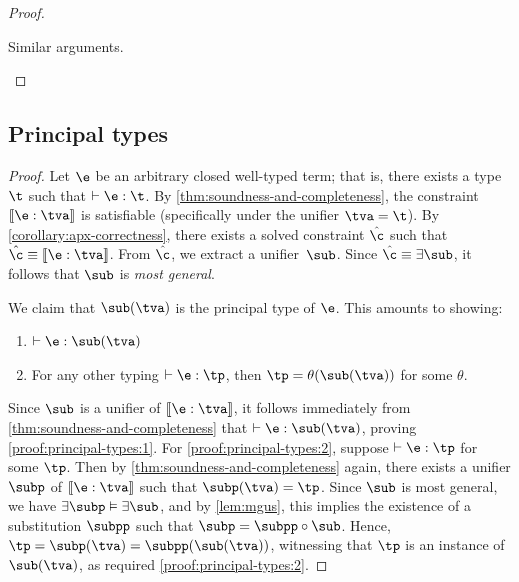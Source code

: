 \documentclass[acmsmall,screen,nonacm%
\Anonymous{,anonymous}{}%
\Final{}{,review}%
]{acmart}
\begin{document}
\begin{theorem}
\begin{proof}
\begin{proofcases}
\begin{proofcases}
\begin{proofcases}
      \proofcase{$\epoly \e$, $\einst \e$, $\erecord {\overline{\elab = \e}}$, $\efield \e \elab$}

	    \begin{llproof}
	      Similar arguments.
	    \end{llproof}
	  \end{proofcases}
	\end{proofcases}
    \end{proofcases}
  \end{proof}
\end{theorem}

\subsection{Principal types}
\label{apx/principal-types}

\principalTypesBIS*
\begin{proof}

Let $\e$ be an arbitrary closed well-typed term; that is, there exists a
type $\t$ such that $\th \e : \t$.  By 
\cref{thm:soundness-and-completeness}, the constraint $\cinfer \e \tv$ is
satisfiable (specifically under the unifier $\cunif \tv \t$). By
\cref{corollary:apx-correctness}, there exists a solved constraint $\hat\c$ such
that $\hat\c \cequiv \cinfer \e \tv$.  From $\hat\c$, we extract a
unifier~$\sub$. Since $\hat\c \cequiv \exists \sub$, it follows that $\sub$
is  \emph{most general}.

We claim that $\sub(\tv)$ is the principal type of $\e$. This amounts to showing:
\begin{enumerate}[(\roman*)]

\item
  \label{proof:principal-types:1}
  $\th \e : \sub(\tv)$

\item
  \label{proof:principal-types:2}
  For any other typing $\th \e : \tp$, then $\tp = \theta(\sub(\tv))$ for
  some $\theta$.

\end{enumerate}
Since $\sub$ is a unifier of $\cinfer \e \tv$, it follows immediately from
\cref{thm:soundness-and-completeness} that $\th \e : \sub(\tv)$, proving
\ref{proof:principal-types:1}.  For \ref{proof:principal-types:2}, suppose
$\th \e : \tp$ for some $\tp$. Then by \cref{thm:soundness-and-completeness}
again, there exists a unifier $\subp$ of $\cinfer \e \tv$ such that
$\subp(\tv) = \tp$. Since $\sub$ is most general, we have $\exists \subp
\centails \exists \sub$, and by \cref{lem:mgus}, this implies the existence
of a substitution $\subpp$ such that $\subp = \subpp \compose \sub$.  Hence,
$\tp = \subp(\tv) = \subpp(\sub(\tv))$, witnessing that $\tp$ is an instance
of $\sub(\tv)$, as required \ref{proof:principal-types:2}.
\end{proof}



\clearpage
\setcounter{tocdepth}{1}
\tableofcontents
\end{document}
